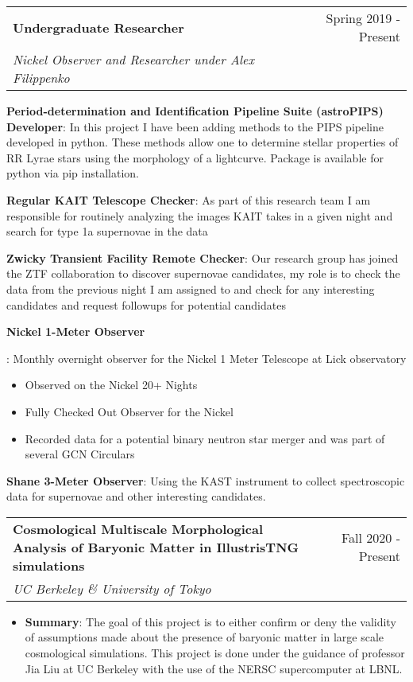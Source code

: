 \documentclass[letterpaper,10pt]{article}
\makeatletter
\newcommand{\resumeItem}[2]{
  \item\small{
    \textbf{#1}{: #2 \vspace{-3pt}}
  }
}
\newcommand{\resumeSubheading}[4]{
  \vspace{-1pt}\item[]
  \begin{tabular*}{0.98\textwidth}{l@{\extracolsep{\fill}}r}
      \hspace{-10pt}\textbf{#1} & #2 \\
      \hspace{-10pt}\textit{\small#3} & \textit{\small #4} \\
    \end{tabular*}\vspace{-3pt}
}
\newcommand{\resumeItemListStart}{\begin{itemize}}
\newcommand{\resumeItemListEnd}{\end{itemize}\vspace{-3pt}}
\makeatother
\begin{document}
    \resumeSubheading
      {Undergraduate Researcher}{Spring 2019 - Present}
      {Nickel Observer and Researcher under Alex Filippenko}{}
      \resumeItemListStart
        \resumeItem{Period-determination and Identification Pipeline Suite (astroPIPS) Developer}{In this project I have been adding methods to the PIPS pipeline developed in python. These methods allow one to determine stellar properties of RR Lyrae stars using the morphology of a lightcurve. Package is available for python via pip installation.}
        \resumeItem{Regular KAIT Telescope Checker}
          {As part of this research team I am responsible for routinely analyzing the images KAIT takes in a given night and search for type 1a supernovae in the data}
        \resumeItem{Zwicky Transient Facility Remote Checker}
            {Our research group has joined the ZTF collaboration to discover supernovae candidates, my role is to check the data from the previous night I am assigned to and check for any interesting candidates and request followups for potential candidates}
        \resumeItem{Nickel 1-Meter Observer}
          {Monthly overnight observer for the Nickel 1 Meter Telescope at Lick observatory
            \begin{itemize}
                \item Observed on the Nickel 20+ Nights
                \item Fully Checked Out Observer for the Nickel
                \item Recorded data for a potential binary neutron star merger and was part of several GCN Circulars
            \end{itemize}
        \resumeItem{Shane 3-Meter Observer}
            {Using the KAST instrument to collect spectroscopic data for supernovae and other interesting candidates.}
          }
      \resumeItemListEnd
      \vspace{4pt}
      \resumeSubheading
        {Cosmological Multiscale Morphological Analysis of Baryonic Matter in IllustrisTNG simulations}{Fall 2020 - Present}{UC Berkeley \& University of Tokyo}{}
        \resumeItemListStart
            \resumeItem{Summary}
                {The goal of this project is to either confirm or deny the validity of assumptions made about the presence of baryonic matter in large scale cosmological simulations. This project is done under the guidance of professor Jia Liu at UC Berkeley with the use of the NERSC supercomputer at LBNL.}
        \resumeItemListEnd
     \vspace{4pt}   
     \resumeSubheading
\end{document}
